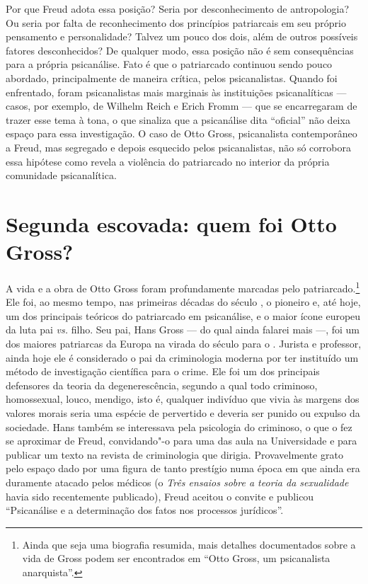 Por que Freud adota essa posição? Seria por desconhecimento de
antropologia? Ou seria por falta de reconhecimento dos princípios
patriarcais em seu próprio pensamento e personalidade? Talvez um pouco
dos dois, além de outros possíveis fatores desconhecidos? De qualquer
modo, essa posição não é sem consequências para a própria psicanálise.
Fato é que o patriarcado continuou sendo pouco abordado, principalmente
de maneira crítica, pelos psicanalistas. Quando foi enfrentado, foram
psicanalistas mais marginais às instituições psicanalíticas --- casos,
por exemplo, de Wilhelm Reich e Erich Fromm --- que se encarregaram de
trazer esse tema à tona, o que sinaliza que a psicanálise dita
``oficial'' não deixa espaço para essa investigação. O caso de Otto
Gross, psicanalista contemporâneo a Freud, mas segregado e depois
esquecido pelos psicanalistas, não só corrobora essa hipótese como
revela a violência do patriarcado no interior da própria comunidade
psicanalítica.

\section{Segunda escovada: quem foi Otto Gross?}

A vida e a obra de Otto Gross foram profundamente marcadas pelo
patriarcado.\footnote{Ainda que seja uma biografia resumida, mais
  detalhes documentados sobre a vida de Gross podem ser encontrados
  em ``Otto Gross, um psicanalista anarquista''.} Ele foi, ao mesmo
tempo, nas primeiras décadas do século , o pioneiro e, até hoje, um
dos principais teóricos do patriarcado em psicanálise, e o maior ícone
europeu da luta pai \emph{vs.} filho. Seu pai, Hans Gross --- do qual
ainda falarei mais ---, foi um dos maiores patriarcas da Europa na virada
do século  para o . Jurista e professor, ainda hoje ele é
considerado o pai da criminologia moderna por ter instituído um método
de investigação científica para o crime. Ele foi um dos principais
defensores da teoria da degenerescência, segundo a qual todo criminoso,
homossexual, louco, mendigo, isto é, qualquer indivíduo que vivia às
margens dos valores morais seria uma espécie de pervertido e deveria ser
punido ou expulso da sociedade. Hans também se interessava pela
psicologia do criminoso, o que o fez se aproximar de Freud, convidando"-o
para uma das aula na Universidade e para publicar um texto na revista de
criminologia que dirigia. Provavelmente grato pelo espaço dado por uma
figura de tanto prestígio numa época em que ainda era duramente atacado
pelos médicos (o \emph{Três ensaios sobre a teoria da sexualidade} havia
sido recentemente publicado), Freud aceitou o convite e publicou
``Psicanálise e a determinação dos fatos nos processos jurídicos''.

